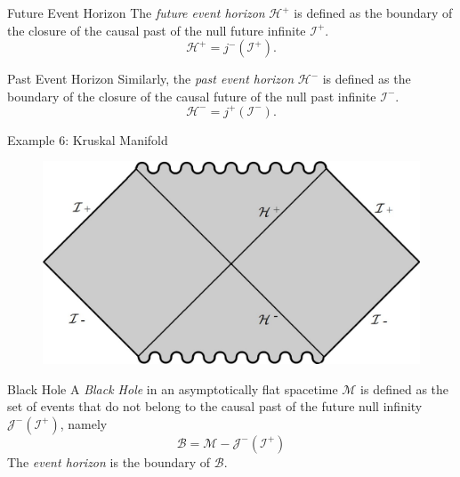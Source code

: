 \documentclass{beamer}
\begin{document}
\begin{darkframes}
        \begin{frame}{Future Event Horizon}
			The \emph{future event horizon }$\mathcal{H}^{+}$ is defined as the
boundary of the closure of the causal past of the null future infinite	$\mathcal{I}^{+}$.
			$$ \mathcal{H}^{+}=j^{-}\left(\mathcal{I}^{+}\right).$$        
		\end{frame}
        
        \begin{frame}{Past Event Horizon}
			Similarly, the \emph{past event horizon }$\mathcal{H}^{-}$ is defined
as the boundary of the closure of the causal future of the null past
infinite $\mathcal{I}^{-}$.
			$$\mathcal{H}^{-}=j^{+}\left(\mathcal{I}^{-}\right).$$   
		\end{frame}
  \end{darkframes}
        
        \begin{frame}{Example 6: Kruskal Manifold}
        	\begin{center}
				\begin{figure}
				\includegraphics[scale=0.75] {fig19.jpg}
				\end{figure}
			\end{center}	
        \end{frame}
		 
  \begin{darkframes}
  		
        \begin{frame}{Black Hole}
			A \textit{Black Hole} in an asymptotically flat spacetime $\mathcal{M}$ is defined as the set of events that do not belong to the causal past of the future null infinity $\mathcal{J}^{-}\left( \mathcal{I}^{+} \right)$, namely
            $$ \mathcal{B} = \mathcal{M} - 
            \mathcal{J}^{-}\left( \mathcal{I}^{+} \right)$$
            \pause
            The \textit{event horizon} is the boundary of $\mathcal{B}$.
		\end{frame}
 	
    \end{darkframes}
        
\end{document}
